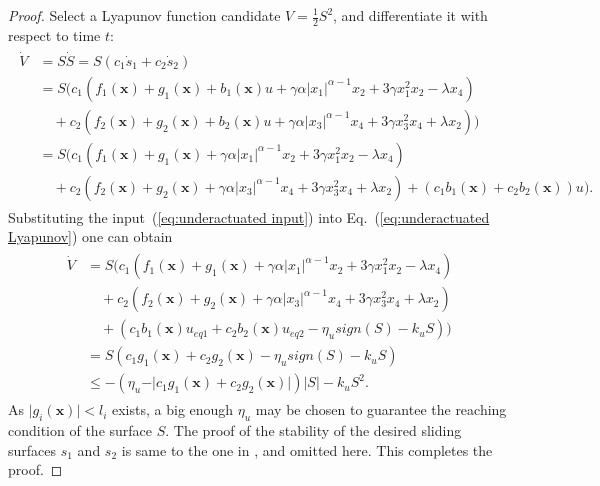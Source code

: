 \documentclass[3p]{elsarticle}
\theoremstyle{plain}
\theoremstyle{remark}
\begin{document}
\begin{proof}
Select a Lyapunov function candidate $V=\frac{1}{2}S^2$, and differentiate it with respect to time $t$:
\begin{align}
\begin{split}
\dot V &= S\dot S = S(c_1\dot s_1+c_2\dot s_2)\\
&=S(c_1(f_1(\bm x)+g_1(\bm x)+b_1(\bm x)u+\gamma\alpha\vert x_1\vert^{\alpha-1}x_2+3\gamma x_1^2x_2-\lambda x_4)\\
&\quad+c_2(f_2(\bm x)+g_2(\bm x)+b_2(\bm x)u+\gamma\alpha\vert x_3\vert^{\alpha-1}x_4+3\gamma x_3^2x_4+\lambda x_2))\\
&=S(c_1(f_1(\bm x)+g_1(\bm x)+\gamma\alpha\vert x_1\vert^{\alpha-1}x_2+3\gamma x_1^2x_2-\lambda x_4)\\
&\quad+c_2(f_2(\bm x)+g_2(\bm x)+\gamma\alpha\vert x_3\vert^{\alpha-1}x_4+3\gamma x_3^2x_4+\lambda x_2)+(c_1b_1(\bm x)+c_2b_2(\bm x))u).\label{eq:underactuated Lyapunov}
\end{split}
\end{align}
Substituting the input~(\ref{eq:underactuated input}) into Eq.~(\ref{eq:underactuated Lyapunov}) one can obtain
\begin{align}
\begin{split}
\dot V &= S(c_1(f_1(\bm x)+g_1(\bm x)+\gamma\alpha\vert x_1\vert^{\alpha-1}x_2+3\gamma x_1^2x_2-\lambda x_4)\\
&\quad+c_2(f_2(\bm x)+g_2(\bm x)+\gamma\alpha\vert x_3\vert^{\alpha-1}x_4+3\gamma x_3^2x_4+\lambda x_2)\\
&\quad+(c_1b_1(\bm x)u_{eq1}+c_2b_2(\bm x)u_{eq2}-\eta_u sign(S)-k_u S))\\
&= S(c_1g_1(\bm x)+c_2g_2(\bm x)-\eta_u sign(S)-k_u S)\\
&\le -(\eta_u -\vert c_1g_1(\bm x)+c_2g_2(\bm x)\vert)\vert S\vert-k_u S^2.
\end{split}
\end{align}
As $\vert g_i(\bm x)\vert<l_i$ exists, a big enough $\eta_u$ may be chosen to guarantee the reaching condition of the surface $S$. The proof of the stability of the desired sliding surfaces $s_1$ and $s_2$ is same to the one in \cite{wang2004design}, and omitted here. This completes the proof.
\end{proof}
\end{document}
